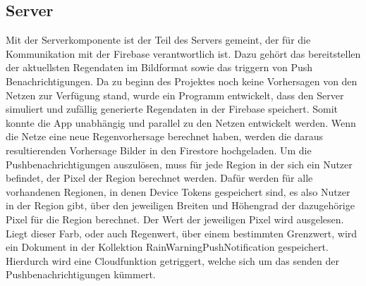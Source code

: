 \subsection{Server}\label{server}
Mit der Serverkomponente ist der Teil des Servers gemeint, der für die Kommunikation mit der Firebase verantwortlich ist. Dazu gehört das bereitstellen der aktuellsten Regendaten im Bildformat sowie das triggern von Push Benachrichtigungen. 
Da zu beginn des Projektes noch keine Vorhersagen von den Netzen zur Verfügung stand, wurde ein Programm entwickelt, dass den Server simuliert und zufällig generierte Regendaten in der Firebase speichert. Somit konnte die App unabhängig und parallel zu den Netzen entwickelt werden.
Wenn die Netze eine neue Regenvorhersage berechnet haben, werden die daraus resultierenden Vorhersage Bilder in den Firestore hochgeladen. 
Um die Pushbenachrichtigungen auszulösen, muss für jede Region in der sich ein Nutzer befindet, der Pixel der Region berechnet werden. 
Dafür werden für alle vorhandenen Regionen, in denen Device Tokens gespeichert sind, es also Nutzer in der Region gibt, über den jeweiligen Breiten und Höhengrad der dazugehörige Pixel für die Region berechnet. Der Wert der jeweiligen Pixel wird ausgelesen. Liegt dieser Farb, oder auch Regenwert, über einem bestimmten Grenzwert, wird ein Dokument in der Kollektion RainWarningPushNotification gespeichert. Hierdurch wird eine Cloudfunktion getriggert, welche sich um das senden der Pushbenachrichtigungen kümmert. 